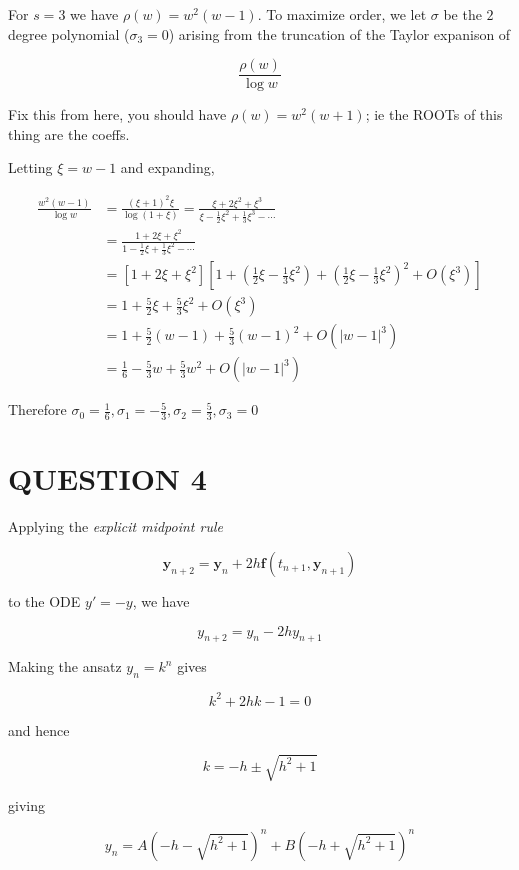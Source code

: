 \documentclass[a4paper]{article}
\begin{document}
For $ s =3 $ we have  $ \rho(w) = w^{2}(w - 1) $.  To maximize order, we let $ \sigma $  be the $ 2 $ degree polynomial ($ \sigma_{3} = 0 $) arising from the truncation of the Taylor expanison of

\[ \frac{\rho(w)}{\log w} \]

Fix this from here, you should have $ \rho(w) = w^{2}(w+1) $; ie the ROOTs of this thing are the coeffs. 


Letting $ \xi = w - 1 $ and expanding,

\begin{align*}
\frac{w^{2}(w-1)}{\log w} & = \frac{(\xi + 1)^{2}\xi}{\log (1 + \xi)} = \frac{\xi + 2 \xi^{2} + \xi^{3}}{\xi - \frac{1}{2} \xi^{2} + \frac{1}{3} \xi^{3} - \cdots } \\
& = \frac{1 + 2 \xi + \xi^{2}}{1 - \frac{1}{2} \xi + \frac{1}{3} \xi^{2} - \cdots} \\
& = [1 + 2 \xi + \xi^{2}][ 1 + (\frac{1}{2} \xi - \frac{1}{3} \xi^{2}) + (\frac{1}{2} \xi - \frac{1}{3} \xi^{2})^{2} + O(\xi^{3})     ] \\
& = 1 + \frac{5}{2} \xi + \frac{5}{3} \xi^{2} + O(\xi^{3}) \\
& = 1 + \frac{5}{2} (w - 1) + \frac{5}{3} (w - 1)^{2} + O(| w-1 |^{3}) \\
& = \frac{1}{6} - \frac{5}{3} w + \frac{5}{3} w^{2} +  O(| w-1 |^{3})
\end{align*}

Therefore $ \sigma_{0} = \frac{1}{6} , \sigma_{1} = - \frac{5}{3}  , \sigma_{2} = \frac{5}{3}  , \sigma_{3} = 0 $


\section{QUESTION 4}

Applying the \emph{explicit midpoint rule}

\[ \mathbf{y}_{n+2} = \mathbf{y}_{n} + 2 h \mathbf{f}(t_{n+1},\mathbf{y}_{n+1}) \]

to the ODE $ y' = - y $, we have


\[ y_{n+2} = y_{n} - 2hy_{n+1} \]

Making the ansatz $ y_{n} = k^{n} $ gives

\[ k^{2} + 2hk - 1 = 0 \]

and hence

\[ k = -h  \pm \sqrt{h^{2} + 1} \]

giving 

\[ y_{n} = A \left(   -h  - \sqrt{h^{2} + 1} \right)^{n} + B  \left(   -h  + \sqrt{h^{2} + 1} \right)^{n}   \]
\end{document}
